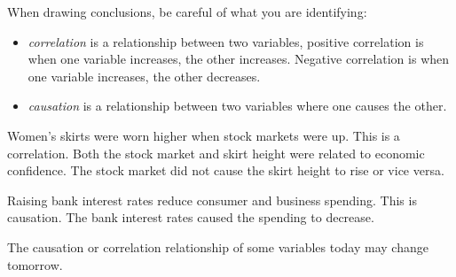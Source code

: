 When drawing conclusions, be careful of what you are identifying:
\begin{itemize}
    \item \begin{definition} \emph{correlation} is a relationship between two variables, positive correlation is when one variable increases, the other increases. Negative correlation is when one variable increases, the other decreases.\end{definition}
    \item \begin{definition} \emph{causation} is a relationship between two variables where one causes the other.\end{definition}
\end{itemize}
\begin{example}
    Women's skirts were worn higher when stock markets were up. This is a correlation. Both the stock market and skirt height were related to economic confidence. The stock market did not cause the skirt height to rise or vice versa.
\end{example}
\begin{example}
    Raising bank interest rates reduce consumer and business spending. This is causation. The bank interest rates caused the spending to decrease.
\end{example}
The causation or correlation relationship of some variables today may change tomorrow.
